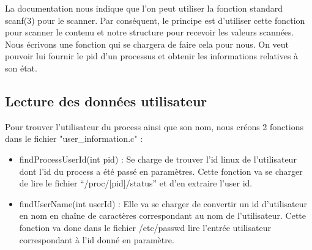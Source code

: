La documentation nous indique que l’on peut utiliser la fonction standard scanf(3) pour le scanner. Par conséquent, le principe est d’utiliser cette fonction pour scanner le contenu et notre structure pour recevoir les valeurs scannées. Nous écrivons une fonction qui se chargera de faire cela pour nous. On veut pouvoir lui fournir le pid d’un processus et obtenir les informations relatives à son état.

\subsection{Lecture des données utilisateur}
Pour trouver l’utilisateur du process ainsi que son nom, nous créons 2 fonctions dans le fichier "user\_information.c" : 

\begin{itemize}
\item findProcessUserId(int pid) : Se charge de trouver l’id linux de l’utilisateur dont l’id du process a été passé en paramètres. Cette fonction va se charger de lire le fichier “/proc/[pid]/status” et d’en extraire l’user id.

\item findUserName(int userId) : Elle va se charger de convertir un id d’utilisateur en nom en chaîne de caractères correspondant au nom de l’utilisateur. Cette fonction va donc dans le fichier /etc/passwd lire l’entrée utilisateur correspondant à l’id donné en paramètre.
\end{itemize}